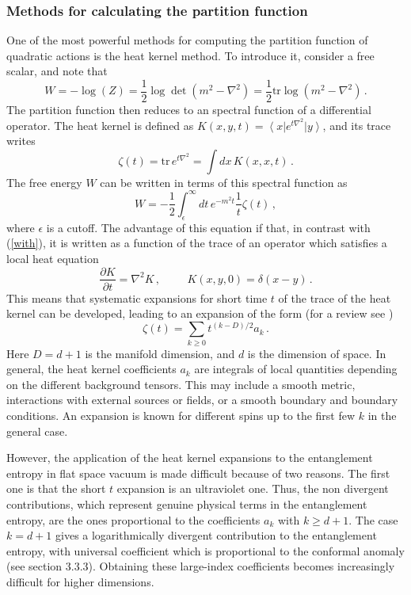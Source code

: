 \documentclass[a4paper]{article}
\begin{document}
\subsubsection{Methods for calculating the partition function}
One of the most powerful methods for computing the partition function of quadratic actions is the heat kernel method. To introduce it, consider a free scalar, and note that
\begin{equation}
W=-\log(Z)=\frac{1}{2} \log \det (m^2-\nabla ^2)=\frac{1}{2}\textrm{tr}\log(m^2-\nabla ^2)\,.\label{with}
\end{equation}
The partition function then reduces to an spectral function of a differential operator. 
The heat kernel is defined as $K(x,y,t)=\left<x\right|e^{ t \nabla^2}\left|y\right>$, and its trace writes
\begin{equation}
\zeta (t)=\textrm{tr}\, e^{ t \nabla^2} =\int dx \, K(x,x,t)\,.
\end{equation}
The free energy $W$ can be written in terms of this spectral function as
\begin{equation}
W=-\frac{1}{2}\int^\infty_\epsilon dt\, e^{-m^2 t} \frac{1}{t}\zeta (t)\,,
\end{equation}
where $\epsilon$ is a cutoff. 
The advantage of this equation if that, in contrast with (\ref{with}), it is written as a function of the trace of an operator which satisfies a local heat equation
\begin{equation}
\frac{\partial K}{\partial t}=\nabla^2 K\,, \hspace{1cm} K(x,y,0)=\delta(x-y)\,.
\end{equation}
This means that systematic expansions for short time $t$ of the trace of the heat kernel can be developed, leading to an expansion of the form (for a review see \cite{vasi})
\begin{equation}
\zeta (t)=\sum_{k\ge 0} t^{(k-D)/2} a_k\,.\label{ggg}
\end{equation}
Here $D=d+1$ is the manifold dimension, and $d$ is the dimension of space. In general, the heat kernel coefficients $a_k$ are integrals of local quantities depending on the different background tensors. This may include a smooth metric, interactions with external sources or fields, or a smooth boundary and boundary conditions. An expansion is known for different spins up to the first few $k$ in the general case.  

However, the application of the heat kernel expansions to the entanglement entropy in flat space vacuum is made difficult because of two reasons.  
The first one is that the short $t$ expansion is an ultraviolet one. Thus, the non divergent contributions, which represent genuine physical terms in the entanglement entropy, are the ones proportional to the coefficients $a_k$ with $k\ge d+1$. The case $k=d+1$ gives a logarithmically divergent contribution to the entanglement entropy, with universal coefficient which is proportional to the conformal anomaly (see section 3.3.3). Obtaining  these large-index coefficients becomes increasingly difficult for higher dimensions. 
\end{document}
